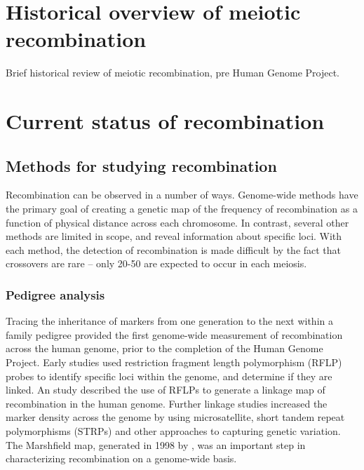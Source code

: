 \section{Historical overview of meiotic recombination}

Brief historical review of meiotic recombination, pre Human Genome Project.

\section{Current status of recombination}

\subsection{Methods for studying recombination}

Recombination can be observed in a number of ways.
Genome-wide methods have the primary goal of creating a genetic map of the frequency of recombination as a function of physical distance across each chromosome.
In contrast, several other methods are limited in scope, and reveal information about specific loci.
With each method, the detection of recombination is made difficult by the fact that crossovers are rare -- only 20-50 are expected to occur in each meiosis.

\subsubsection{Pedigree analysis}

Tracing the inheritance of markers from one generation to the next within a family pedigree provided the first genome-wide measurement of recombination across the human genome, prior to the completion of the Human Genome Project.
Early studies used restriction fragment length polymorphism (RFLP) probes to identify specific loci within the genome, and determine if they are linked.
An study described the use of RFLPs to generate a linkage map of recombination in the human genome\cite{Botstein1980}.
Further linkage studies increased the marker density across the genome by using microsatellite, short tandem repeat polymorphisms (STRPs) and other approaches to capturing genetic variation\cite{Morton1991,Matise1994,Dib1996}.
The Marshfield map, generated in 1998 by \citet{Broman1998}, was an important step in characterizing recombination on a genome-wide basis.

